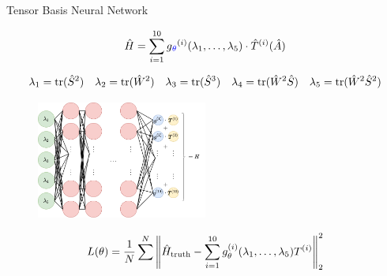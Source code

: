 \begin{frame}{Tensor Basis Neural Network}

  \begin{equation}
    \hat{H} = \sum_{i=1}^{10} g\textcolor{blue}{_{\theta}}^{(i)}(\lambda_1, \dots, \lambda_5)\cdot \hat{T}^{(i)}(\hat{A})
  \end{equation}

  \begin{small}
    \begin{equation*}
      \lambda_1 = \text{tr}(\hat{S}^2) \quad \lambda_2 = \text{tr}(\hat{W}^2) \quad \lambda_3 = \text{tr}(\hat{S}^3) \quad \lambda_4 = \text{tr}(\hat{W}^2\hat{S}) \quad \lambda_5 = \text{tr}(\hat{W}^2\hat{S}^2)
    \end{equation*}
  \end{small}
  \begin{figure}
    \centering
    \includegraphics[width=0.5\textwidth]{./tbnn.png}
    \label{fig:tbnn}
  \end{figure}

  \begin{equation}
    L(\theta) = \frac{1}{N}\sum^N\left\lVert\hat{H}_{\text{truth}} - \sum_{i=1}^{10}g_\theta^{(i)}(\lambda_1, \dots, \lambda_5)T^{(i)}\right\rVert_2^2
  \end{equation}
\end{frame}

